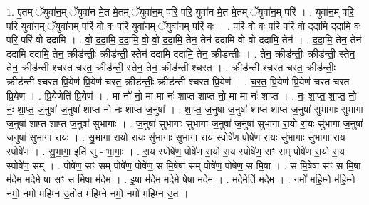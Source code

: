 \documentclass[17pt]{extarticle}
\begin{document}
1. ए॒तम् ॅयुवा॑न॒म् ॅयुवा॑न मे॒त मे॒तम् ॅयुवा॑न॒म् परि॒ परि॒ युवा॑न मे॒त मे॒तम् ॅयुवा॑न॒म् परि॑ । . युवा॑न॒म् परि॒ परि॒ युवा॑न॒म् ॅयुवा॑न॒म् परि॑ वो वः॒ परि॒ युवा॑न॒म् ॅयुवा॑न॒म् परि॑ वः । . परि॑ वो वः॒ परि॒ परि॑ वो ददामि ददामि वः॒ परि॒ परि॑ वो ददामि । . वो॒ द॒दा॒मि॒ द॒दा॒मि॒ वो॒ वो॒ द॒दा॒मि॒ तेन॒ तेन॑ ददामि वो वो ददामि॒ तेन॑ । . द॒दा॒मि॒ तेन॒ तेन॑ ददामि ददामि॒ तेन॒ क्रीड॑न्तीः॒ क्रीड॑न्ती॒ स्तेन॑ ददामि ददामि॒ तेन॒ क्रीड॑न्तीः । . तेन॒ क्रीड॑न्तीः॒ क्रीड॑न्ती॒ स्तेन॒ तेन॒ क्रीड॑न्ती श्चरत चरत॒ क्रीड॑न्ती॒ स्तेन॒ तेन॒ क्रीड॑न्ती श्चरत । . क्रीड॑न्ती श्चरत चरत॒ क्रीड॑न्तीः॒ क्रीड॑न्ती श्चरत प्रि॒येण॑ प्रि॒येण॑ चरत॒ क्रीड॑न्तीः॒ क्रीड॑न्ती श्चरत प्रि॒येण॑ । . च॒र॒त॒ प्रि॒येण॑ प्रि॒येण॑ चरत चरत प्रि॒येण॑ । . प्रि॒येणेति॑ प्रि॒येण॑ । . मा नो॑ नो॒ मा मा नः॑ शाप्त शाप्त नो॒ मा मा नः॑ शाप्त । . नः॒ शा॒प्त॒ शा॒प्त॒ नो॒ नः॒ शा॒प्त॒ ज॒नुषा॑ ज॒नुषा॑ शाप्त नो नः शाप्त ज॒नुषा᳚ । . शा॒प्त॒ ज॒नुषा॑ ज॒नुषा॑ शाप्त शाप्त ज॒नुषा॑ सुभागाः सुभागा ज॒नुषा॑ शाप्त शाप्त ज॒नुषा॑ सुभागाः । . ज॒नुषा॑ सुभागाः सुभागा ज॒नुषा॑ ज॒नुषा॑ सुभागा रा॒यो रा॒यः सु॑भागा ज॒नुषा॑ ज॒नुषा॑ सुभागा रा॒यः । . सु॒भा॒गा॒ रा॒यो रा॒यः सु॑भागाः सुभागा रा॒य स्पोषे॑ण॒ पोषे॑ण रा॒यः सु॑भागाः सुभागा रा॒य स्पोषे॑ण । . सु॒भा॒गा॒ इति॑ सु - भा॒गाः॒ । . रा॒य स्पोषे॑ण॒ पोषे॑ण रा॒यो रा॒य स्पोषे॑ण॒ सꣳ सम् पोषे॑ण रा॒यो रा॒य स्पोषे॑ण॒ सम् । . पोषे॑ण॒ सꣳ सम् पोषे॑ण॒ पोषे॑ण॒ स मि॒षेषा सम् पोषे॑ण॒ पोषे॑ण॒ स मि॒षा । . स मि॒षेषा सꣳ स मि॒षा म॑देम मदेमे॒ षा सꣳ स मि॒षा म॑देम । . इ॒षा म॑देम मदेमे॒ षेषा म॑देम । . म॒दे॒मेति॑ मदेम । . नमो॑ महि॒म्ने म॑हि॒म्ने नमो॒ नमो॑ महि॒म्न उ॒तोत म॑हि॒म्ने नमो॒ नमो॑ महि॒म्न उ॒त । \newline
\end{document}
